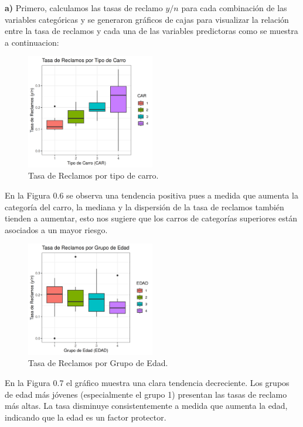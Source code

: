 \newpage
\textbf{a)} Primero, calculamos las tasas de reclamo $y/n$ para cada combinación de las variables categóricas y se generaron gráficos de cajas para visualizar la relación entre la tasa de reclamos y cada una de las variables predictoras como se muestra a continuacion:

\begin{figure}[H]
    \centering
    \includegraphics[width=0.5\textwidth]{images/rate_vs_car.png}
    \caption{Tasa de Reclamos por tipo de carro.}
    \label{fig:car_boxplot}
\end{figure}

En la Figura 0.6 se observa una tendencia positiva pues a medida que aumenta la categoría del carro, la mediana y la dispersión de la tasa de reclamos también tienden a aumentar, esto nos sugiere que los carros de categorías superiores están asociados a un mayor riesgo.

\begin{figure}[H]
    \centering
    \includegraphics[width=0.5\textwidth]{images/rate_vs_edad.png}
    \caption{Tasa de Reclamos por Grupo de Edad.} 
    \label{fig:edad_boxplot}
\end{figure}

En la Figura 0.7 el gráfico muestra una clara tendencia decreciente. Los grupos de edad más jóvenes (especialmente el grupo 1) presentan las tasas de reclamo más altas. La tasa disminuye consistentemente a medida que aumenta la edad, indicando que la edad es un factor protector.

